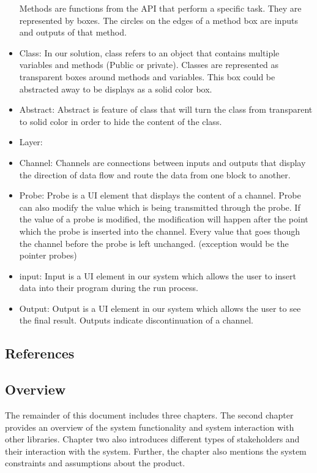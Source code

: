 \documentclass[journal,10pt,onecolumn,compsoc]{IEEEtran} \usepackage[margin=1.0in]{geometry} \usepackage{pdfpages} \usepackage{graphicx}
\begin{document}
\begin{itemize}
		Methods are functions from the API that perform a specific task. They are represented by boxes.
		The circles on the edges of a method box are inputs and outputs of that method.
	\item Class: 
		In our solution, class refers to an object that contains multiple variables and methods (Public or private).
		Classes are represented as transparent boxes around methods and variables. This box could be abstracted away to be displays as a solid color box.
	\item Abstract:
		Abstract is feature of class that will turn the class from transparent to solid color in order to hide the content of the class.
	\item Layer: 
	\item Channel:
		 Channels are connections between inputs and outputs that display the direction of data flow and route the data from one block to another. 
	\item Probe:
		Probe is a UI element that displays the content of a channel.
		Probe can also modify the value which is being transmitted through the probe.
		If the value of a probe is modified, the modification will happen after the point which the probe is inserted into the channel.
		Every value that goes though the channel before the probe is left unchanged. (exception would be the pointer probes)
	\item input:
		Input is a UI element in our system which allows the user to insert data into their program during the run process.
	\item Output:
		Output is a UI element in our system which allows the user to see the final result. Outputs indicate discontinuation of a channel.
\end{itemize}
\subsection{References}
\subsection{Overview}

The remainder of this document includes three chapters. 
The second chapter provides an overview of the system functionality and system interaction with other libraries. 
Chapter two also introduces different types of stakeholders and their interaction with the system. 
Further, the chapter also mentions the system constraints and assumptions about the product.
\end{document}

